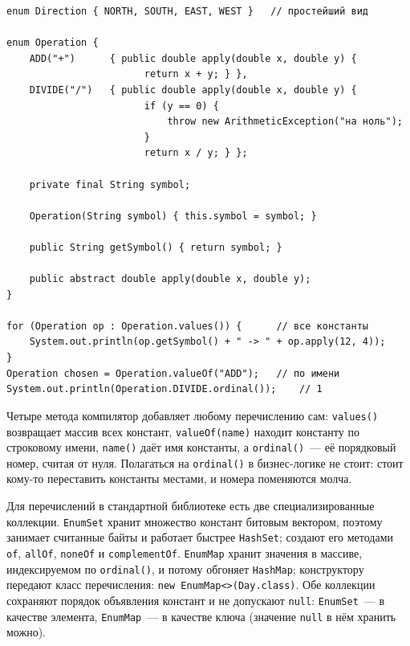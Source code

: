\begin{listing}[H]
\begin{verbatim}
enum Direction { NORTH, SOUTH, EAST, WEST }   // простейший вид

enum Operation {
    ADD("+")      { public double apply(double x, double y) {
                        return x + y; } },
    DIVIDE("/")   { public double apply(double x, double y) {
                        if (y == 0) {
                            throw new ArithmeticException("на ноль");
                        }
                        return x / y; } };

    private final String symbol;

    Operation(String symbol) { this.symbol = symbol; }

    public String getSymbol() { return symbol; }

    public abstract double apply(double x, double y);
}

for (Operation op : Operation.values()) {      // все константы
    System.out.println(op.getSymbol() + " -> " + op.apply(12, 4));
}
Operation chosen = Operation.valueOf("ADD");   // по имени
System.out.println(Operation.DIVIDE.ordinal());    // 1
\end{verbatim}
\caption{Перечисление с полем, конструктором и абстрактным методом}
\label{lst:02-11}
\end{listing}

Четыре метода компилятор добавляет любому перечислению сам:
\texttt{values()} возвращает массив всех констант, \texttt{valueOf(name)}
находит константу по строковому имени, \texttt{name()} даёт имя константы, а
\texttt{ordinal()}~--- её порядковый номер, считая от нуля. Полагаться на
\texttt{ordinal()} в бизнес-логике не стоит: стоит кому-то переставить
константы местами, и номера поменяются молча.

Для перечислений в стандартной библиотеке есть две специализированные
коллекции. \texttt{EnumSet} хранит множество констант битовым вектором,
поэтому занимает считанные байты и работает быстрее \texttt{HashSet}; создают
его методами \texttt{of}, \texttt{allOf}, \texttt{noneOf} и
\texttt{complementOf}. \texttt{EnumMap} хранит значения в массиве,
индексируемом по \texttt{ordinal()}, и потому обгоняет \texttt{HashMap};
конструктору передают класс перечисления: \texttt{new EnumMap<>(Day.class)}.
Обе коллекции сохраняют порядок объявления констант и не допускают
\texttt{null}: \texttt{EnumSet}~--- в качестве элемента, \texttt{EnumMap}~---
в качестве ключа (значение \texttt{null} в нём хранить можно).

